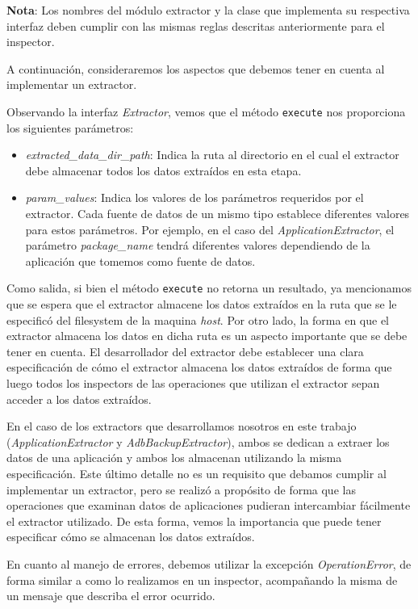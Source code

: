 \textbf{Nota}: Los nombres del módulo extractor y la clase que implementa su respectiva interfaz deben cumplir con las mismas reglas descritas anteriormente para el inspector.

A continuación, consideraremos los aspectos que debemos tener en cuenta al implementar un extractor.

Observando la interfaz \emph{Extractor}, vemos que el método \texttt{execute} nos proporciona los siguientes parámetros:

\begin{itemize}
\item \emph{extracted\_data\_dir\_path}: Indica la ruta al directorio en el cual el extractor debe almacenar todos los datos extraídos en esta etapa.
\item \emph{param\_values}: Indica los valores de los parámetros requeridos por el extractor. Cada fuente de datos de un mismo tipo establece diferentes valores para estos parámetros. Por ejemplo, en el caso del \emph{ApplicationExtractor}, el parámetro \emph{package\_name} tendrá diferentes valores dependiendo de la aplicación que tomemos como fuente de datos.
\end{itemize}

Como salida, si bien el método \texttt{execute} no retorna un resultado, ya mencionamos que se espera que el extractor almacene los datos extraídos en la ruta que se le especificó del filesystem de la maquina \emph{host}. Por otro lado, la forma en que el extractor almacena los datos en dicha ruta es un aspecto importante que se debe tener en cuenta. El desarrollador del extractor debe establecer una clara especificación de cómo el extractor almacena los datos extraídos de forma que luego todos los inspectors de las operaciones que utilizan el extractor sepan acceder a los datos extraídos.

En el caso de los extractors que desarrollamos nosotros en este trabajo (\emph{ApplicationExtractor} y \emph{AdbBackupExtractor}), ambos se dedican a extraer los datos de una aplicación y ambos los almacenan utilizando la misma especificación. Este último detalle no es un requisito que debamos cumplir al implementar un extractor, pero se realizó a propósito de forma que las operaciones que examinan datos de aplicaciones pudieran intercambiar fácilmente el extractor utilizado. De esta forma, vemos la importancia que puede tener especificar cómo se almacenan los datos extraídos.

En cuanto al manejo de errores, debemos utilizar la excepción \emph{OperationError}, de forma similar a como lo realizamos en un inspector, acompañando la misma de un mensaje que describa el error ocurrido.

